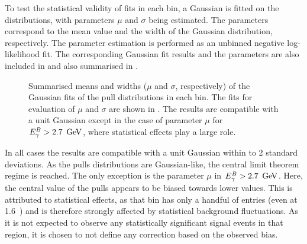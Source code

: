 To test the statistical validity of \Mbc fits in each bin, a Gaussian \PDF is fitted on the distributions, with parameters $\mu$ and $\sigma$ being estimated.
The parameters correspond to the mean value and the width of the Gaussian distribution, respectively.
The parameter estimation is performed as an unbinned negative log-likelihood fit.
The corresponding Gaussian fit results and the parameters are also included in  and also summarised in .
\begin{figure}[htbp!]
    \centering
    \caption{\label{fig:mean_sigma_pulls}Summarised means and widths ($\mu$ and $\sigma$, respectively) of the Gaussian fits of
    the pull distributions in each \EB bin.
    The fits for evaluation of $\mu$ and $\sigma$ are shown in .
    The results are compatible with a unit Gaussian except in the case of parameter $\mu$ for \mbox{${E^B_{\gamma}}>2.7~\mathrm{\,Ge\kern -0.1em V}$}, where statistical effects play a large role.
    }
\end{figure}

In all cases the results are compatible with a unit Gaussian within to 2 standard deviations.
As the pulls distributions are Gaussian-like, the central limit theorem regime is reached.
The only exception is the parameter $\mu$  in ${E^B_{\gamma}}>2.7~\mathrm{\,Ge\kern -0.1em V}$.
Here, the central value of the pulls appears to be biased towards lower values.
This is attributed to statistical effects, as that bin has only a handful of entries (even at 1.6~\invab) and is therefore strongly affected by statistical background fluctuations.
As it is not expected to observe any statistically significant signal events in that region, it is chosen to not define any correction based on the observed bias.

